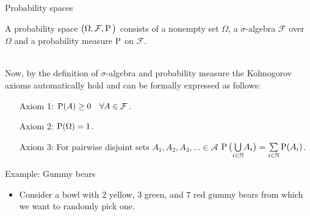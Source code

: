 \documentclass[a4,11pt]{beamer}
\newlength{\wideitemsep}
\let\olditem\item
\renewcommand{\item}{\setlength{\itemsep}{\wideitemsep}\olditem}
\begin{document}
\begin{frame}{Probability spaces}
\begin{definition}
    A probability space $\big(\Omega,\mathcal{F},\operatorname{P}\big)$ consists of a nonempty set $\Omega$, a $\sigma$-algebra $\mathcal{F}$ over $\Omega$ and a probability measure $\operatorname{P}$ on $\mathcal{F}$.
\end{definition}\,\\ Now, by the definition of $\sigma$-algebra and probability measure the Kolmogorov axioms automatically hold and can be formally expressed as follows:\bigskip\\
    \hspace*{.9cm}\begin{minipage}{.9\linewidth}
     \begin{itemize}
        \item[Axiom 1:] $\operatorname{P}(A)\geq 0\quad \forall A\in\mathcal{F}$.
        \item[Axiom 2:] $\operatorname{P}(\Omega)=1$.
        \item[Axiom 3:] For pairwise disjoint sets $A_1,A_2,A_3,...\in\mathcal{A}$ $\operatorname{P}\big(\underset{i\in\mathbb{N}}{\bigcup}A_i\big)=\underset{i\in\mathbb{N}}{\sum}\operatorname{P}(A_i)$.
    \end{itemize}   
    \end{minipage}

\end{frame}
{
\begin{frame}{Example: Gummy bears}
\vspace*{-3cm}
    \begin{itemize}
        \item Consider a bowl with $2$ yellow, $3$ green, and $7$ red gummy bears from which we want to randomly pick one.
    \end{itemize}
    
\end{frame}
}
\end{document}
